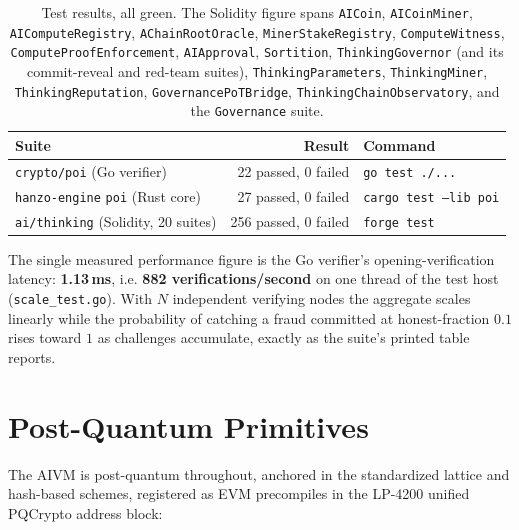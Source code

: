 \documentclass[11pt,a4paper]{article}
\begin{document}
\begin{table}[h]
\centering
\begin{tabular}{lrl}
\toprule
\textbf{Suite} & \textbf{Result} & \textbf{Command} \\
\midrule
\texttt{crypto/poi} (Go verifier) & 22 passed, 0 failed & \texttt{go test ./...} \\
\texttt{hanzo-engine} \texttt{poi} (Rust core) & 27 passed, 0 failed & \texttt{cargo test --lib poi} \\
\texttt{ai/thinking} (Solidity, 20 suites) & 256 passed, 0 failed & \texttt{forge test} \\
\bottomrule
\end{tabular}
\caption{Test results, all green. The Solidity figure spans \texttt{AICoin}, \texttt{AICoinMiner}, \texttt{AIComputeRegistry}, \texttt{AChainRootOracle}, \texttt{MinerStakeRegistry}, \texttt{ComputeWitness}, \texttt{ComputeProofEnforcement}, \texttt{AIApproval}, \texttt{Sortition}, \texttt{ThinkingGovernor} (and its commit-reveal and red-team suites), \texttt{ThinkingParameters}, \texttt{ThinkingMiner}, \texttt{ThinkingReputation}, \texttt{GovernancePoTBridge}, \texttt{ThinkingChainObservatory}, and the \texttt{Governance} suite.}
\end{table}

The single measured performance figure is the Go verifier's opening-verification latency: \textbf{1.13\,ms}, i.e. \textbf{882 verifications/second} on one thread of the test host (\texttt{scale\_test.go}). With $N$ independent verifying nodes the aggregate scales linearly while the probability of catching a fraud committed at honest-fraction $0.1$ rises toward $1$ as challenges accumulate, exactly as the suite's printed table reports.

\section{Post-Quantum Primitives}\label{sec:pq}

The AIVM is post-quantum throughout, anchored in the standardized lattice and hash-based schemes, registered as EVM precompiles in the LP-4200 unified PQCrypto address block:
\end{document}

